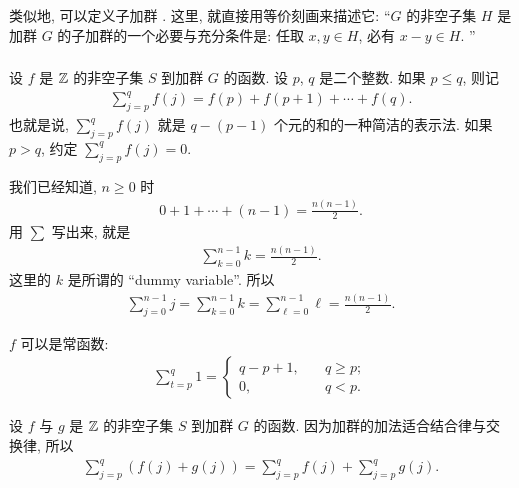 \begin{remark}
    类似地, 可以定义子加群 . 这里, 就直接用等价刻画来描述它: ``$G$ 的非空子集 $H$ 是加群 $G$ 的子加群的一个必要与充分条件是: 任取 $x,y \in H$, 必有 $x-y \in H$. ''
\end{remark}

\subsubsection*{\Sums}

\begin{definition}
    设 $f$ 是 $\mathbb{Z}$ 的非空子集 $S$ 到加群 $G$ 的函数. 设 $p$, $q$ 是二个整数. 如果 $p \leq q$, 则记
    \begin{align*}
        \sum_{j = p}^{q} f(j) = f(p) + f(p + 1) + \cdots + f(q).
    \end{align*}
    也就是说, $\sum_{j = p}^{q} f(j)$ 就是 $q - (p - 1)$ 个元的和的一种简洁的表示法. 如果 $p > q$, 约定 $\sum_{j = p}^{q} f(j) = 0$.
\end{definition}

\begin{example}
    我们已经知道, $n \geq 0$ 时
    \begin{align*}
        0 + 1 + \cdots + (n-1) = \frac{n(n-1)}{2}.
    \end{align*}
    用 $\sum$ 写出来, 就是
    \begin{align*}
        \sum_{k=0}^{n-1} k = \frac{n(n-1)}{2}.
    \end{align*}
    这里的 $k$ 是所谓的 ``dummy variable''. 所以
    \begin{align*}
        \sum_{j=0}^{n-1} j = \sum_{k=0}^{n-1} k = \sum_{\ell=0}^{n-1} \ell = \frac{n(n-1)}{2}.
    \end{align*}
\end{example}

\begin{example}
    $f$ 可以是常函数:
    \begin{align*}
        \sum_{t=p}^{q} 1 = \begin{cases}
            q - p + 1, & \quad q \geq p; \\
            0,         & \quad q < p.
        \end{cases}
    \end{align*}
\end{example}

\begin{example}
    设 $f$ 与 $g$ 是 $\mathbb{Z}$ 的非空子集 $S$ 到加群 $G$ 的函数. 因为加群的加法适合结合律与交换律, 所以
    \begin{align*}
        \sum_{j=p}^{q} (f(j) + g(j)) = \sum_{j=p}^{q} f(j) + \sum_{j=p}^{q} g(j).
    \end{align*}
\end{example}

